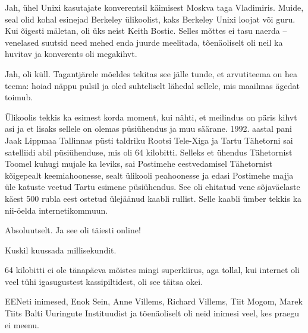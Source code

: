 
Jah, ühel Unixi kasutajate konverentsil käimisest Moskva taga Vladimiris. Muide, seal olid kohal esinejad Berkeley ülikoolist, 
kaks Berkeley Unixi loojat või guru. Kui õigesti mäletan, oli üks neist 
Keith Bostic. Selles mõttes ei tasu naerda -- venelased suutsid need mehed 
enda juurde meelitada, tõenäoliselt oli neil ka huvitav ja konverents oli 
megakihvt.


Jah, oli küll. Tagantjärele mõeldes tekitas see jälle tunde, et arvutiteema on hea 
teema: hoiad näppu pulsil ja oled suhteliselt lähedal sellele, mis 
maailmas ägedat toimub.

Ülikoolis tekkis ka esimest korda moment, kui nähti, et meilindus on päris 
kihvt asi ja et lisaks sellele on olemas püsiühendus ja muu säärane. 1992. 
aastal pani Jaak Lippmaa 
Tallinnas püsti taldriku Rootsi Tele-Xiga ja Tartu Tähetorni sai satelliidi abil püsiühenduse, mis oli 64 kilobitti. Selleks et 
ühendus Tähetornist Toomel kuhugi mujale ka leviks, sai Postimehe 
eestvedamisel Tähetornist kõigepealt keemiahoonesse, sealt ülikooli peahoonesse ja edasi Postimehe majja 
üle katuste veetud Tartu esimene püsiühendus. See oli ehitatud vene 
sõjaväelaste käest 500 rubla eest ostetud ülejäänud kaabli rullist.
Selle kaabli ümber tekkis ka nii-öelda internetikommuun. 


Absoluutselt. Ja see oli täiesti online!


Kuskil kuussada millisekundit.


64 kilobitti ei ole tänapäeva mõistes mingi superkiirus, aga 
tollal, kui internet oli veel tühi igasugustest kassipiltidest, oli see 
täitsa okei.


EENeti inimesed, Enok Sein, 
Anne Villems, Richard Villems, 
Tiit Mogom, Marek Tiits Balti Uuringute Instituudist ja tõenäoliselt oli neid inimesi 
veel, kes praegu ei meenu.

